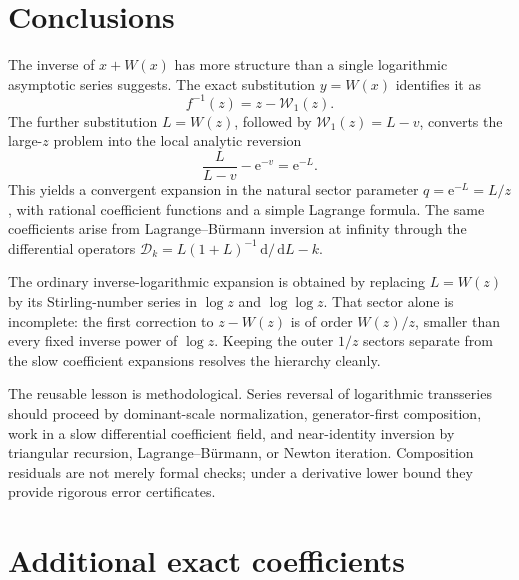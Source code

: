 \documentclass[11pt,a4paper]{article}
\numberwithin{equation}{section}
\theoremstyle{definition}
\theoremstyle{remark}
\newcommand{\e}{\mathrm e}
\newcommand{\dd}{\,\mathrm d}
\newcommand{\rW}{\mathcal W}
\begin{document}
\section{Conclusions}

The inverse of \(x+W(x)\) has more structure than a single logarithmic
asymptotic series suggests.  The exact substitution \(y=W(x)\) identifies
it as
\[
  f^{-1}(z)=z-\rW_1(z).
\]
The further substitution \(L=W(z)\), followed by
\(\rW_1(z)=L-v\), converts the large-\(z\) problem into the local analytic
reversion
\[
  \frac{L}{L-v}-\e^{-v}=\e^{-L}.
\]
This yields a convergent expansion in the natural sector parameter
\(q=\e^{-L}=L/z\), with rational coefficient functions and a simple
Lagrange formula.  The same coefficients arise from Lagrange--B\"urmann
inversion at infinity through the differential operators
\(
\mathcal D_k=L(1+L)^{-1}\dd/\dd L-k
\).

The ordinary inverse-logarithmic expansion is obtained by replacing
\(L=W(z)\) by its Stirling-number series in \(\log z\) and
\(\log\log z\).  That sector alone is incomplete: the first correction to
\(z-W(z)\) is of order \(W(z)/z\), smaller than every fixed inverse power
of \(\log z\).  Keeping the outer \(1/z\) sectors separate from the slow
coefficient expansions resolves the hierarchy cleanly.

The reusable lesson is methodological.  Series reversal of logarithmic
transseries should proceed by dominant-scale normalization, generator-first
composition, work in a slow differential coefficient field, and
near-identity inversion by triangular recursion, Lagrange--B\"urmann, or
Newton iteration.  Composition residuals are not merely formal checks;
under a derivative lower bound they provide rigorous error certificates.

\appendix

\section{Additional exact coefficients}
\end{document}
